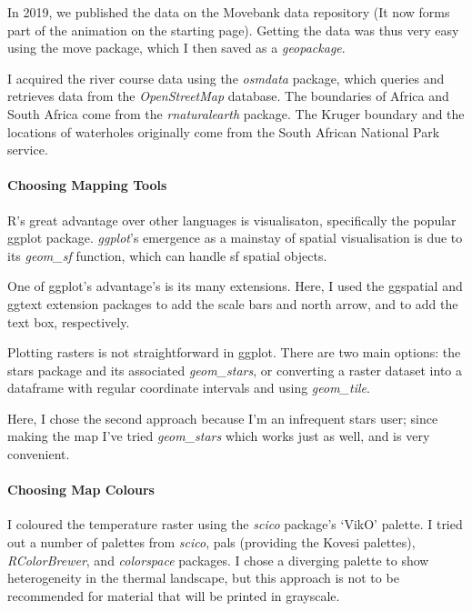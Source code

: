 	In 2019, we published the data on the Movebank data repository (It now forms part of the animation on the starting page). Getting the data was thus very easy using the move package, which I then saved as a \textit{geopackage}.

	I acquired the river course data using the \textit{osmdata} package, which queries and retrieves data from the \textit{OpenStreetMap} database. The boundaries of Africa and South Africa come from the \textit{rnaturalearth} package. The Kruger boundary and the locations of waterholes originally come from the South African National Park service.

	\paragraph*{Choosing Mapping Tools}

	R's great advantage over other languages is visualisaton, specifically the popular ggplot package. \textit{ggplot}'s emergence as a mainstay of spatial visualisation is due to its \textit{geom\_sf} function, which can handle sf spatial objects.
	
	One of ggplot's advantage's is its many extensions. Here, I used the ggspatial and ggtext extension packages to add the scale bars and north arrow, and to add the text box, respectively.
	
	Plotting rasters is not straightforward in ggplot. There are two main options: the stars package and its associated \textit{geom\_stars}, or converting a raster dataset into a dataframe with regular coordinate intervals and using \textit{geom\_tile}.
	
	Here, I chose the second approach because I'm an infrequent stars user; since making the map I've tried \textit{geom\_stars} which works just as well, and is very convenient.

	\paragraph*{Choosing Map Colours}

	I coloured the temperature raster using the \textit{scico} package's `VikO' palette. I tried out a number of palettes from \textit{scico}, pals (providing the Kovesi palettes), \textit{RColorBrewer}, and \textit{colorspace} packages. I chose a diverging palette to show heterogeneity in the thermal landscape, but this approach is not to be recommended for material that will be printed in grayscale.

